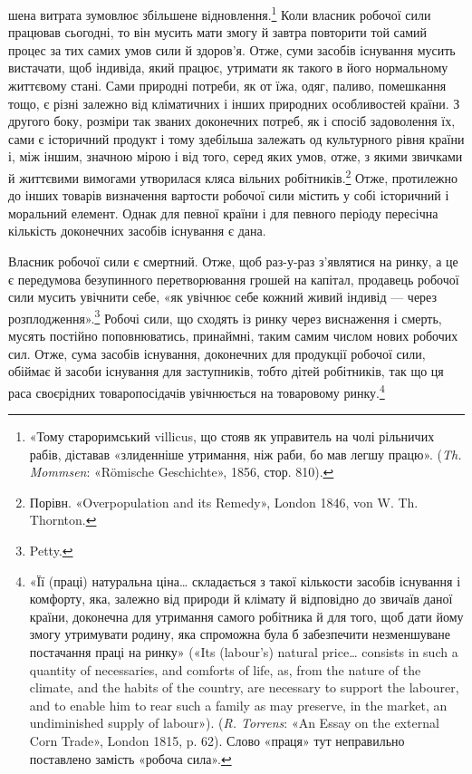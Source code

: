 \parcont{}  %
шена витрата зумовлює збільшене відновлення.\footnote{
«Тому староримський villicus, що стояв як управитель на чолі
рільничих рабів, діставав «злиденніше утримання, ніж раби, бо мав
легшу працю». (\emph{Th. Mommsen}: «Römische Geschichte», 1856, стор. 810).
} Коли власник
робочої сили працював сьогодні, то він мусить мати змогу й завтра
повторити той самий процес за тих самих умов сили й здоров’я.
Отже, суми засобів існування мусить вистачати, щоб індивіда,
який працює, утримати як такого в його нормальному життєвому
стані. Сами природні потреби, як от їжа, одяг, паливо, помешкання
тощо, є різні залежно від кліматичних і інших природних
особливостей країни. З другого боку, розміри так званих доконечних
потреб, як і спосіб задоволення їх, сами є історичний
продукт і тому здебільша залежать од культурного рівня країни
і, між іншим, значною мірою і від того, серед яких умов, отже,
з якими звичками й життєвими вимогами утворилася кляса вільних
робітників.\footnote{
Порівн. «Overpopulation and its Remedy», London 1846, von W. Th.
Thornton.
} Отже, протилежно до інших товарів визначення
вартости робочої сили містить у собі історичний і моральний
елемент. Однак для певної країни і для певного періоду пересічна
кількість доконечних засобів існування є дана.

Власник робочої сили є смертний. Отже, щоб раз-у-раз
з’являтися на ринку, а це є передумова безупинного перетворювання
грошей на капітал, продавець робочої сили мусить увічнити
себе, «як увічнює себе кожний живий індивід — через
розплодження».\footnote{
Petty.
} Робочі сили, що сходять із ринку через виснаження
і смерть, мусять постійно поповнюватись, принаймні,
таким самим числом нових робочих сил. Отже, сума засобів
існування, доконечних для продукції робочої сили, обіймає й
засоби існування для заступників, тобто дітей робітників, так
що ця раса своєрідних товаропосідачів увічнюється на товаровому
ринку.\footnote{
«Її (праці) натуральна ціна\dots{} складається з такої кількости засобів
існування і комфорту, яка, залежно від природи й клімату й відповідно
до звичаїв даної країни, доконечна для утримання самого робітника
й для того, щоб дати йому змогу утримувати родину, яка спроможна
була б забезпечити незменшуване постачання праці на ринку» («Its
(labour’s) natural price\dots{} consists in such a quantity of necessaries, and
comforts of life, as, from the nature of the climate, and the habits of the
country, are necessary to support the labourer, and to enable him to rear
such a family as may preserve, in the market, an undiminished supply of
labour»). (\emph{R. Torrens}: «An Essay on the external Corn Trade», London
1815, p. 62). Слово «праця» тут неправильно поставлено замість «робоча
сила».
}

